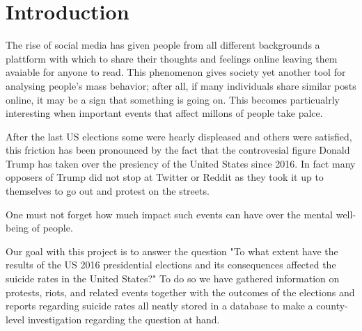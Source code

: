 \section{Introduction}
\label{g1:sec:introduction}

The rise of social media has given people from all different
backgrounds a plattform with which to share their thoughts
and feelings online leaving them avaiable for anyone to read.
This phenomenon gives society yet another tool for analysing
people's mass behavior; after all, if many individuals share
similar posts online, it may be a sign that something
is going on.
This becomes particualrly interesting
when important events that affect millons of people take
palce.

After the last US elections
some were hearly displeased and others were
satisfied, this friction has been pronounced by the fact
that the controvesial figure Donald Trump has taken over
the presiency of the United States since 2016. In fact many opposers of Trump did not stop at Twitter or Reddit as they
took it up to themselves to go out and protest on the streets.

One must not forget how much impact such events can have over
the mental well-being of people.

Our goal with this project is to answer the question
"To what extent have the results of the US 2016 presidential
elections and its consequences
affected the suicide rates in the United States?"
To do so we have gathered information on protests, riots, and
related events together with the outcomes of the elections
and reports regarding suicide rates all neatly stored in a database
to make a county-level investigation
regarding the question at hand.
